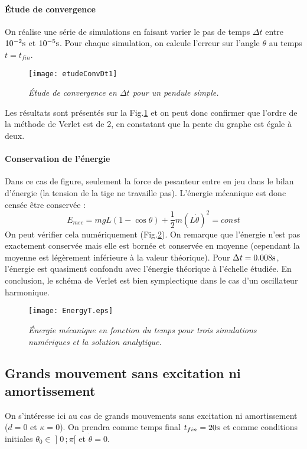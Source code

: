 \documentclass[a4paper,12pt,oneside]{article}
\def \be {\begin{equation}}
\def \ee {\end{equation}}
\def \t {\theta}
\def \vt {\Dot{\theta}}
\begin{document}
\paragraph{Étude de convergence} %
On réalise une série de simulations en faisant varier le pas de temps $\Delta t$ entre $10^{-2} \rm s$ et $10^{-5} \rm s$. Pour chaque simulation, on calcule l'erreur sur l'angle $\t$ au temps $t=t_{fin}$.
\begin{figure}[H]
    \centerline{\texttt{[image: etudeConvDt1]}}
\caption{ \label{etudeConvDt1}\em
Étude de convergence en $\Delta t$ pour un pendule simple. 
}
\end{figure}
Les résultats sont présentés sur la Fig.\ref{etudeConvDt1} et on peut donc confirmer que l'ordre de la méthode de Verlet est de 2, en constatant que la pente du graphe est égale à deux.

\paragraph{Conservation de l'énergie} %
Dans ce cas de figure, seulement la force de pesanteur entre en jeu dans le bilan d'énergie (la tension de la tige ne travaille pas). L'énergie mécanique est donc censée être conservée :
\be
E_{mec}=mgL(1-\cos{\t})+ \frac{1}{2}m(L\vt)^2= const
\ee
On peut vérifier cela numériquement (Fig.\ref{energy1}). On remarque que l'énergie n'est pas exactement conservée mais elle est bornée et conservée en moyenne (cependant la moyenne est légèrement inférieure à la valeur théorique). Pour $\Delta t=0.008 \rm{s}$, l'énergie est quasiment confondu avec l'énergie théorique à l'échelle étudiée. En conclusion, le schéma de Verlet est bien symplectique dans le cas d'un oscillateur harmonique.
\begin{figure}[H]
    \centerline{\texttt{[image: EnergyT.eps]}}
\caption{ \label{energy1}\em
Énergie mécanique en fonction du temps pour trois simulations numériques et la solution analytique.
}
\end{figure}

\subsection{Grands mouvement sans excitation ni amortissement \label{grandMvmt}}
On s'intéresse ici au cas de grands mouvements sans excitation ni amortissement ($d=0$ et $\kappa=0$). On prendra comme temps final $t_{fin}=20 \rm s$ et comme conditions initiales $\t_0 \in \mathopen{]}0\,;\pi \mathopen{[}$ et $\vt=0$.
\end{document}
